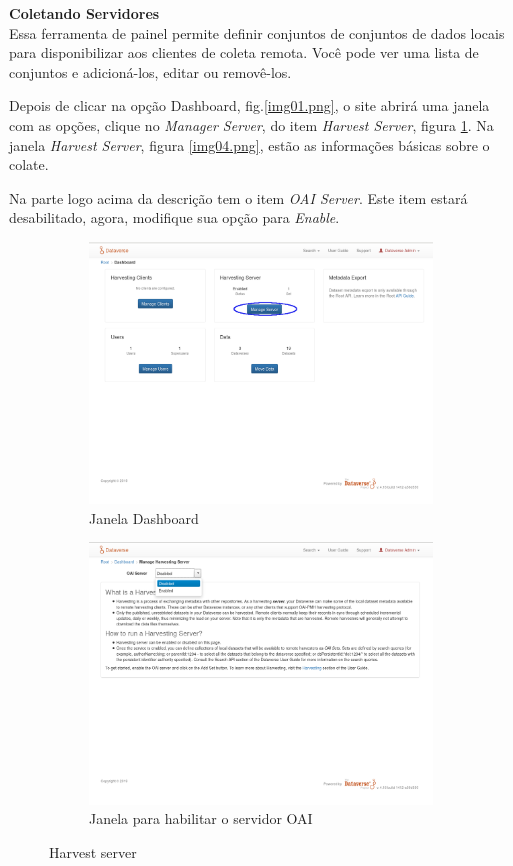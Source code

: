 \documentclass[12pt,hidelinks]{article}
\begin{document}
\textbf{Coletando Servidores}\\

Essa ferramenta de painel permite definir conjuntos de conjuntos de dados locais para disponibilizar aos clientes de coleta remota. Você pode ver uma lista de conjuntos e adicioná-los, editar ou removê-los.

Depois de clicar na opção Dashboard, fig.\ref{img01.png}, o site abrirá uma janela com as opções, clique no \textit{Manager Server}, do item \textit{Harvest Server}, figura \ref{img02.png}. Na janela \textit{Harvest Server}, figura \ref{img04.png}, estão as informações básicas sobre o colate. 

Na parte logo acima da descrição tem o item \textit{OAI Server}. Este item estará desabilitado, agora, modifique sua opção para \textit{Enable}.
 
 \begin{figure}[ht]
\begin{subfigure}{.5\textwidth}
  \centering
  \includegraphics[width=.9\linewidth]{imagens/02.png}  
  \caption{Janela Dashboard}
  \label{img02.png}
\end{subfigure}
\begin{subfigure}{.5\textwidth}
  \centering
  \includegraphics[width=.9\linewidth]{imagens/04.png}  
  \caption{Janela para habilitar o servidor OAI}
  \label{img03.png}
\end{subfigure}
\caption{Harvest server}
\label{img0203}
\end{figure}
\end{document}

